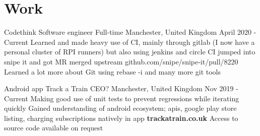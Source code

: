 \documentclass{my_cv}
\begin{document}
\section{Work}

\workDetails
{Codethink}
{Software engineer}
{Full-time}
{Manchester, United Kingdom}
{April 2020 - Current}
\workdetails
{Learned and made heavy use of CI, mainly through gitlab (I now have a personal cluster of RPI runners) but also using jenkins and circle CI}
{jumped into snipe it and got MR merged upstream github.com/snipe/snipe-it/pull/8220}
{Learned a lot more about Git using  rebase -i and many more git tools}
\stopworkdetails

\workDetails
{Android app}
{Track a Train}
{CEO? }
{Manchester, United Kingdom}
{Nov 2019 - Current}
\workdetails
{Making good use of unit tests to prevent regressions while iterating quickly}
{Gained understanding of android ecosystem; apis, google play store listing, charging subscriptions natively in app}
{\textbf{trackatrain.co.uk }Access to source code available on request}
\stopworkdetails
\end{document}
